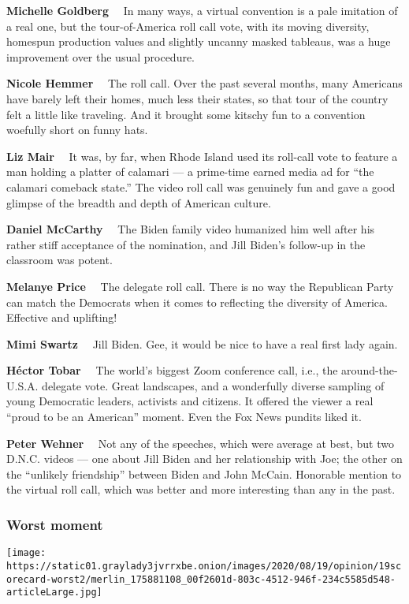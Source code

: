 \textbf{Michelle Goldberg}~~ In many ways, a virtual convention is a
pale imitation of a real one, but the tour-of-America roll call vote,
with its moving diversity, homespun production values and slightly
uncanny masked tableaus, was a huge improvement over the usual
procedure.

\textbf{Nicole Hemmer}~~ The roll call. Over the past several months,
many Americans have barely left their homes, much less their states, so
that tour of the country felt a little like traveling. And it brought
some kitschy fun to a convention woefully short on funny hats.

\textbf{Liz Mair}~~ It was, by far, when Rhode Island used its roll-call
vote to feature a man holding a platter of calamari --- a prime-time
earned media ad for ``the calamari comeback state.'' The video roll call
was genuinely fun and gave a good glimpse of the breadth and depth of
American culture.

\textbf{Daniel McCarthy}~~ The Biden family video humanized him well
after his rather stiff acceptance of the nomination, and Jill Biden's
follow-up in the classroom was potent.

\textbf{Melanye Price}~~ The delegate roll call. There is no way the
Republican Party can match the Democrats when it comes to reflecting the
diversity of America. Effective and uplifting!

\textbf{Mimi Swartz}~~ Jill Biden. Gee, it would be nice to have a real
first lady again.

\textbf{Héctor Tobar}~~ The world's biggest Zoom conference call, i.e.,
the around-the-U.S.A. delegate vote. Great landscapes, and a wonderfully
diverse sampling of young Democratic leaders, activists and citizens. It
offered the viewer a real ``proud to be an American'' moment. Even the
Fox News pundits liked it.

\textbf{Peter Wehner}~~ Not any of the speeches, which were average at
best, but two D.N.C. videos --- one about Jill Biden and her
relationship with Joe; the other on the ``unlikely friendship'' between
Biden and John McCain. Honorable mention to the virtual roll call, which
was better and more interesting than any in the past.

\hypertarget{worst-moment}{%
\subsubsection{Worst moment}\label{worst-moment}}

\texttt{[image: https://static01.graylady3jvrrxbe.onion/images/2020/08/19/opinion/19scorecard-worst2/merlin\_175881108\_00f2601d-803c-4512-946f-234c5585d548-articleLarge.jpg]}

